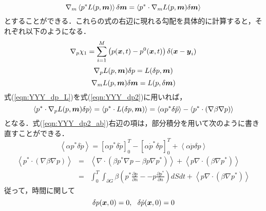 \begin{equation}
	\nabla_m \left< p^*  L(p,\mbox{\boldmath $m$}) \right> \delta \mbox{\boldmath $m$}
	=
	\left< p^*  \cdot \nabla_m L(p,\mbox{\boldmath $m$}) \delta \mbox{\boldmath $m$}\right> 
	\label{eqn:YYY_dm3}
\end{equation}
とすることができる．これらの式の右辺に現れる勾配を具体的に計算すると，それぞれ以下のようになる．
\begin{equation}
	\nabla_p \chi_1 =
	\sum_{i=1}^M \left(p(\mbox{\boldmath $x$},t)-p^0(\mbox{\boldmath $x$},t)\right) \delta(\mbox{\boldmath $x$}-\mbox{\boldmath $y$}_i)
	\label{eqn:YYY_dm_chi1}
\end{equation}
\begin{equation}
	\nabla_p L(p,\mbox{\boldmath $m$})\delta p 
	=
	L(\delta p,\mbox{\boldmath $m$})
	\label{eqn:YYY_dp_L}
\end{equation}
\begin{equation}
	\nabla_m L(p,\mbox{\boldmath $m$})\delta \mbox{\boldmath $m$} 
	=
	L(p,\delta \mbox{\boldmath $m$})
	\label{eqn:YYY_dm_L}
\end{equation}
式(\ref{eqn:YYY_dp_L})を式(\ref{eqn:YYY_dp2})に用いれば，
\begin{equation}
	\left< p^*  \cdot \nabla_p L(p,\mbox{\boldmath $m$})\delta p \right> 
	=
	\left< p^*  \cdot L(\delta p,\mbox{\boldmath $m$}) \right> 
	=
	\left<
		\alpha p^*\delta\ddot{p}
	\right>
	-
	\left<
		p^* \cdot \left( \nabla \beta \nabla p\right)
	\right>
	\label{eqn:YYY_dp2_ab}
\end{equation}
となる．式(\ref{eqn:YYY_dp2_ab})右辺の項は，部分積分を用いて次のように書き直すことができる．
\begin{equation}
	\left<
		\alpha p^*\delta\ddot{p}
	\right>
	=
	\left[ 
		\alpha p^* \delta \dot{p}	
	\right]_0^T
	-
	\left[ 
		\alpha \dot{p}^* \delta p	
	\right]_0^T
	+
	\left< \alpha\ddot{p} \delta p \right>
	\label{eqn:YYY_08}
\end{equation}
\begin{eqnarray}
	\left<
		p^* \cdot \left( \nabla \beta \nabla p\right)
	\right>
	&=&
	\left<
		\nabla\cdot
		\left( \beta p^*\nabla p -\beta p \nabla p^* \right)
	\right>
	+
	\left<
		p \nabla\cdot \left( \beta \nabla p^* \right)
	\right> \\
	\label{eqn:YYY_09}
	&=&
	\int_0^T\int_{\partial G}
	\beta\left( 
		p^* \frac{\partial p}{\partial n}
		-
		-p \frac{\partial p^*}{\partial n}
	\right)
	dS
	dt
	+
	\left<
		p \nabla\cdot \left( \beta \nabla p^* \right)
	\right>
	\label{eqn:YYY_10}
\end{eqnarray}
従って，時間に関して
\begin{equation}
	\delta p(\mbox{\boldmath $x$},0)=0, \ \ \delta \dot{p} (\mbox{\boldmath $x$},0)=0
	\label{eqn:YYY_11}
\end{equation}
